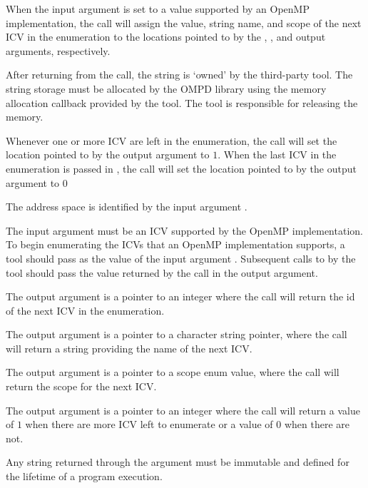 When the  input argument is set to a value supported by an OpenMP 
implementation,
the call will assign the value, string name, and scope of the next ICV in the enumeration
to the locations pointed to by the 
, , and  output arguments, respectively.

After returning from the call, the string  is `owned' by the 
third-party tool.
The string storage must be allocated by the OMPD library using the memory allocation 
callback provided by the tool.
The tool is responsible for releasing the memory.


Whenever one or more ICV are left in the enumeration,
the call will set the location pointed to by the  
output argument to $1$.
When the last ICV in the enumeration is passed in , 
the call will set the location pointed to by the  output
argument to $0$


\argdesc

The address space is identified by the input argument .

The input argument  must be an ICV supported by the OpenMP implementation.  
To begin enumerating the ICVs that an OpenMP implementation supports, a tool should pass
 as the value of the input argument .  
Subsequent calls to  by the tool should pass the
value returned by the call in the  output argument.

The output argument  is a pointer to an integer where
the call will return the id of the next ICV in the
enumeration.

The output argument  is a pointer to a
character string pointer, where the call will return a string
providing the name of the next ICV.

The output argument  is a pointer to a
scope enum value, where the call will return the scope for the next ICV.

The output argument  is a pointer to an integer where
the call will return a value of $1$ when there are more ICV left to enumerate
or a value of $0$ when there are not.

\constraints
Any string returned through the argument
 must be immutable and defined
for the lifetime of a program execution.

